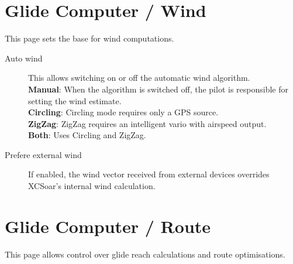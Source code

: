 \section{Glide Computer / Wind} \label{sec:wind}

This page sets the base for wind computations.

\begin{description}
\item[Auto wind]  \label{conf:autowind} This allows switching on or off the
  automatic wind algorithm. \\
  {\bf Manual}: When the algorithm is switched off, the pilot is responsible for
  setting the wind estimate. \\
  {\bf Circling}: Circling mode requires only a GPS source. \\
  {\bf ZigZag}: ZigZag requires an intelligent vario with airspeed output. \\
  {\bf Both}:  Uses Circling and ZigZag.
\item[Prefere external wind]  If enabled, the wind vector received from external
  devices overrides XCSoar's internal wind calculation.
\end{description}


\section{Glide Computer / Route}

This page allows control over glide reach calculations and route
optimisations.

